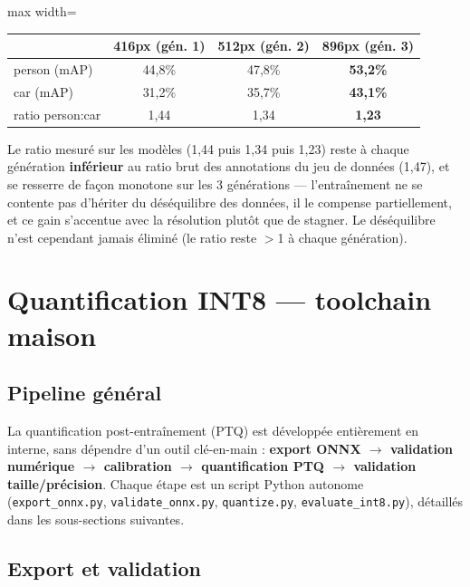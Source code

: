 \documentclass[11pt,a4paper]{article}
\let\Oldsubsection\subsection
\renewcommand{\subsection}{\FloatBarrier\Oldsubsection}
\begin{document}
    \begin{table}[!htbp]
    \centering
    \small
    \begin{adjustbox}{max width=\linewidth}
    \begin{tabular}{@{}lccc@{}}
    \toprule
    & \textbf{416px (gén. 1)} & \textbf{512px (gén. 2)} & \textbf{896px (gén. 3)} \\
    \midrule
    person (mAP) & 44,8\% & 47,8\% & \textbf{53,2\%} \\
    car (mAP) & 31,2\% & 35,7\% & \textbf{43,1\%} \\
    ratio person:car & 1,44 & 1,34 & \textbf{1,23} \\
    \bottomrule
    \end{tabular}
    \end{adjustbox}
    \end{table}
    
    Le ratio mesuré sur les modèles (1,44 puis
    1,34 puis 1,23) reste à chaque génération \textbf{inférieur} au ratio
    brut des annotations du jeu de données (1,47), et se resserre de façon
    monotone sur les 3 générations --- l'entraînement ne se contente pas
    d'hériter du déséquilibre des données, il le compense partiellement,
    et ce gain s'accentue avec la résolution plutôt que de stagner. Le
    déséquilibre n'est cependant jamais éliminé (le ratio reste $>$1 à
    chaque génération).
    
    
    \section{Quantification INT8 --- toolchain maison}
    
    \subsection{Pipeline général}
    
    La quantification post-entraînement (PTQ) est développée entièrement en
    interne, sans dépendre d'un outil clé-en-main : \textbf{export ONNX
    $\to$ validation numérique $\to$ calibration $\to$ quantification PTQ
    $\to$ validation taille/précision}. Chaque étape est un script Python
    autonome (\texttt{export\_onnx.py}, \texttt{validate\_onnx.py},
    \texttt{quantize.py}, \texttt{evaluate\_int8.py}), détaillés dans les
    sous-sections suivantes.
    
    \subsection{Export et validation}
    
\end{document}

